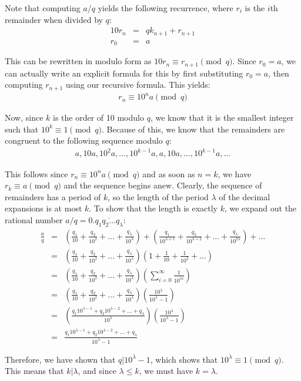 \documentclass[psamsfonts]{amsart}
\newenvironment{sol}{{\bfseries Solution}}{\qedsymbol}
\theoremstyle{definition}
\theoremstyle{remark}
\numberwithin{equation}{section}
\begin{document}
\begin{sol}
Note that computing $a/q$ yields the following recurrence, where $r_i$ is the $i$th remainder when divided by $q$:
\begin{eqnarray}
10 r_n &=& qk_{n+1}  + r_{n+1} \\
r_0 &=& a
\end{eqnarray}

This can be rewritten in modulo form as $10 r_n \equiv r_{n+1} \pmod{q}$. Since $r_0 = a$, we can actually write an explicit formula for this by first substituting $r_0 = a$, then computing $r_{n+1}$ using our recursive formula. This yields:
\begin{eqnarray}
r_{n} \equiv 10^{n} a \pmod{q} 
\end{eqnarray}

Now, since $k$ is the order of 10 modulo $q$, we know that it is the smallest integer such that $10^{k} \equiv 1 \pmod{q}$. Because of this, we know that the remainders are congruent to the following sequence modulo $q$:
\begin{eqnarray}
a, 10a, 10^2a, \ldots, 10^{k-1} a, a, 10a, \ldots, 10^{k-1}a, \ldots
\end{eqnarray}

This follows since $r_n \equiv 10^{n} a \pmod{q}$ and as soon as $n = k$, we have $r_k \equiv a \pmod{q}$ and the sequence begins anew. Clearly, the sequence of remainders has a period of $k$, so the length of the period $\lambda$ of the decimal expansions is at most $k$. To show that the length is exactly $k$, we expand out the rational number $a/q = 0.\overline{q_1 q_2 \ldots q_\lambda}$:
\begin{eqnarray}
\frac{a}{q} &=& \left( \frac{q_1}{10} + \frac{q_2}{10^2} + \ldots + \frac{q_{\lambda}}{10^{\lambda}} \right) + \left( \frac{q_1}{10^{\lambda + 1}} + \frac{q_2}{10^{\lambda + 2}} + \ldots + \frac{q_{\lambda}}{10^{2\lambda}} \right) + \ldots \\
&=& \left( \frac{q_1}{10} + \frac{q_2}{10^2} + \ldots + \frac{q_{\lambda}}{10^{\lambda}} \right) \left( 1 + \frac{1}{10} + \frac{1}{10^2} + \ldots \right) \\
&=& \left( \frac{q_1}{10} + \frac{q_2}{10^2} + \ldots + \frac{q_{\lambda}}{10^{\lambda}} \right)  \left( \sum_{i=0}^\infty \frac{1}{10^{\lambda i}} \right) \\
&=& \left( \frac{q_1}{10} + \frac{q_2}{10^2} + \ldots + \frac{q_{\lambda}}{10^{\lambda}} \right) \left( \frac{10^{\lambda}}{10^{\lambda} - 1} \right) \\
&=& \left( \frac{q_1 10^{\lambda - 1} + q_2 10^{\lambda - 2} + \ldots + q_{\lambda}}{10^{\lambda}} \right) \left( \frac{10^{\lambda}}{10^{\lambda} - 1} \right) \\
&=&  \frac{q_1 10^{\lambda - 1} + q_2 10^{\lambda - 2} + \ldots + q_{\lambda}}{10^{\lambda} - 1}
\end{eqnarray}

Therefore, we have shown that $q | 10^{\lambda} - 1$, which shows that $10^{\lambda} \equiv 1 \pmod{q}$. This means that $k | \lambda$, and since $\lambda \leq k$, we must have $k = \lambda$. 

\end{sol}
\end{document}

